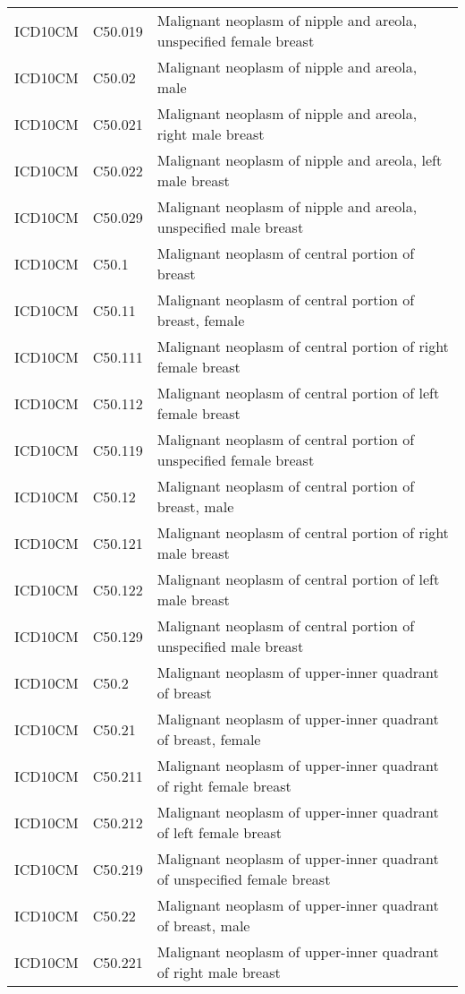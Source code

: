 \begin{longtable}{p{}p{}p{}}
  ICD10CM & C50.019 & Malignant neoplasm of nipple and areola, unspecified female breast \\ 
  ICD10CM & C50.02 & Malignant neoplasm of nipple and areola, male \\ 
  ICD10CM & C50.021 & Malignant neoplasm of nipple and areola, right male breast \\ 
  ICD10CM & C50.022 & Malignant neoplasm of nipple and areola, left male breast \\ 
  ICD10CM & C50.029 & Malignant neoplasm of nipple and areola, unspecified male breast \\ 
  ICD10CM & C50.1 & Malignant neoplasm of central portion of breast \\ 
  ICD10CM & C50.11 & Malignant neoplasm of central portion of breast, female \\ 
  ICD10CM & C50.111 & Malignant neoplasm of central portion of right female breast \\ 
  ICD10CM & C50.112 & Malignant neoplasm of central portion of left female breast \\ 
  ICD10CM & C50.119 & Malignant neoplasm of central portion of unspecified female breast \\ 
  ICD10CM & C50.12 & Malignant neoplasm of central portion of breast, male \\ 
  ICD10CM & C50.121 & Malignant neoplasm of central portion of right male breast \\ 
  ICD10CM & C50.122 & Malignant neoplasm of central portion of left male breast \\ 
  ICD10CM & C50.129 & Malignant neoplasm of central portion of unspecified male breast \\ 
  ICD10CM & C50.2 & Malignant neoplasm of upper-inner quadrant of breast \\ 
  ICD10CM & C50.21 & Malignant neoplasm of upper-inner quadrant of breast, female \\ 
  ICD10CM & C50.211 & Malignant neoplasm of upper-inner quadrant of right female breast \\ 
  ICD10CM & C50.212 & Malignant neoplasm of upper-inner quadrant of left female breast \\ 
  ICD10CM & C50.219 & Malignant neoplasm of upper-inner quadrant of unspecified female breast \\ 
  ICD10CM & C50.22 & Malignant neoplasm of upper-inner quadrant of breast, male \\ 
  ICD10CM & C50.221 & Malignant neoplasm of upper-inner quadrant of right male breast \\ 

\end{longtable}

